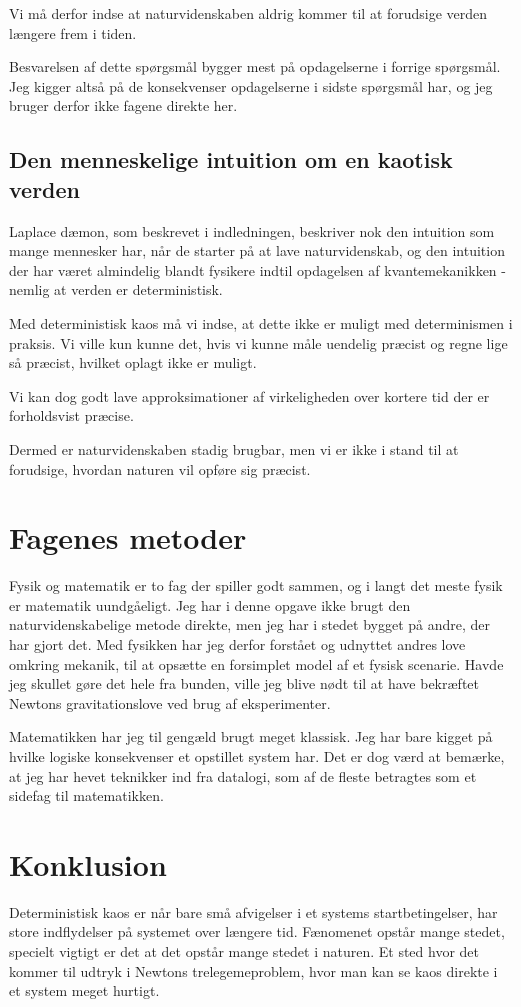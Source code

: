 \documentclass[12pt,a4paper]{article}
\theoremstyle{break}
\theoremstyle{nonumberplain}
\begin{document}
Vi må derfor indse at naturvidenskaben aldrig kommer til at forudsige verden længere frem i tiden. 

Besvarelsen af dette spørgsmål bygger mest på opdagelserne i forrige spørgsmål. 
Jeg kigger altså på de konsekvenser opdagelserne i sidste spørgsmål har, og jeg bruger derfor ikke fagene direkte her. 

\subsection{Den menneskelige intuition om en kaotisk verden}
Laplace dæmon, som beskrevet i indledningen, beskriver nok den intuition som mange mennesker har, når de starter på at lave naturvidenskab, og den intuition der har været almindelig blandt fysikere indtil opdagelsen af kvantemekanikken - nemlig at verden er deterministisk.

Med deterministisk kaos må vi indse, at dette ikke er muligt med determinismen i praksis. 
Vi ville kun kunne det, hvis vi kunne måle uendelig præcist og regne lige så præcist, hvilket oplagt ikke er muligt.

Vi kan dog godt lave approksimationer af virkeligheden over kortere tid der er forholdsvist præcise. 

Dermed er naturvidenskaben stadig brugbar, men vi er ikke i stand til at forudsige, hvordan naturen vil opføre sig præcist.

\section{Fagenes metoder}
Fysik og matematik er to fag der spiller godt sammen, og i langt det meste fysik er matematik uundgåeligt. 
Jeg har i denne opgave ikke brugt den naturvidenskabelige metode direkte, men jeg har i stedet bygget på andre, der har gjort det. 
Med fysikken har jeg derfor forstået og udnyttet andres love omkring mekanik, til at opsætte en forsimplet model af et fysisk scenarie.
Havde jeg skullet gøre det hele fra bunden, ville jeg blive nødt til at have bekræftet Newtons gravitationslove ved brug af eksperimenter. 


Matematikken har jeg til gengæld brugt meget klassisk. 
Jeg har bare kigget på hvilke logiske konsekvenser et opstillet system har. 
Det er dog værd at bemærke, at jeg har hevet teknikker ind fra datalogi, som af de fleste betragtes som et sidefag til matematikken. 

\section{Konklusion}
Deterministisk kaos er når bare små afvigelser i et systems startbetingelser, har store indflydelser på systemet over længere tid.
Fænomenet opstår mange stedet, specielt vigtigt er det at det opstår mange stedet i naturen. 
Et sted hvor det kommer til udtryk i Newtons trelegemeproblem, hvor man kan se kaos direkte i et system meget hurtigt.
\end{document}
